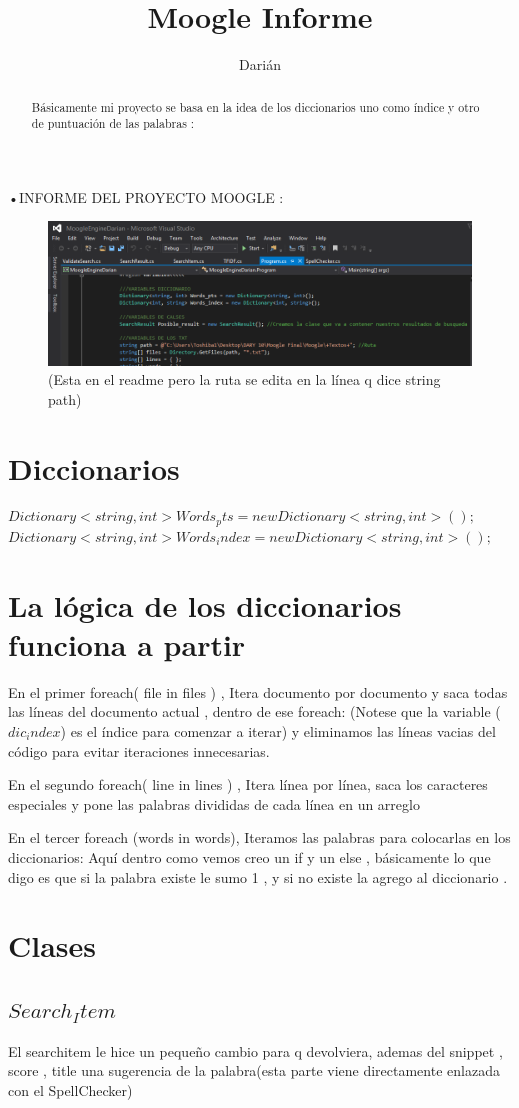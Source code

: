 \documentclass[12pt,a4paper]{article}
\author{Darián}
\title{Moogle Informe}
\begin{document}
•INFORME DEL PROYECTO MOOGLE :
\begin{abstract}
Básicamente mi proyecto se basa en la idea de los diccionarios uno como  índice y otro de puntuación de las palabras :
\end{abstract}

\begin{figure}[H]
\centering
\includegraphics[scale=0.5]{Primero}
\caption{(Esta en el readme pero la ruta se edita en la línea q dice string path)}
\end{figure}
\section{Diccionarios}
$Dictionary<string,int> Words_pts = new Dictionary<string , int >();$
$Dictionary<string,int> Words_index = new Dictionary<string , int >();$
\section{La lógica de los diccionarios funciona a partir }
En el primer foreach( file in files ) , Itera documento por documento y saca todas las líneas del documento actual , dentro de ese foreach:
(Notese que la variable ($dic_index$) es el índice para comenzar a iterar) y eliminamos las líneas vacias del código para evitar iteraciones innecesarias.

En el segundo foreach( line in lines ) , Itera línea por línea, saca los caracteres especiales y pone las palabras divididas de cada línea en un arreglo

En el tercer foreach (words in words), Iteramos las palabras para colocarlas en los diccionarios:
Aquí dentro como vemos creo un if y un else , básicamente lo que digo es que si la palabra existe le sumo 1 , y si no existe la agrego al diccionario .

\section{Clases}
\subsection{$Search_Item$}
El searchitem le hice un pequeño cambio para q devolviera, ademas del snippet , score , title una sugerencia de la palabra(esta parte viene directamente enlazada con el SpellChecker)
\end{document}

